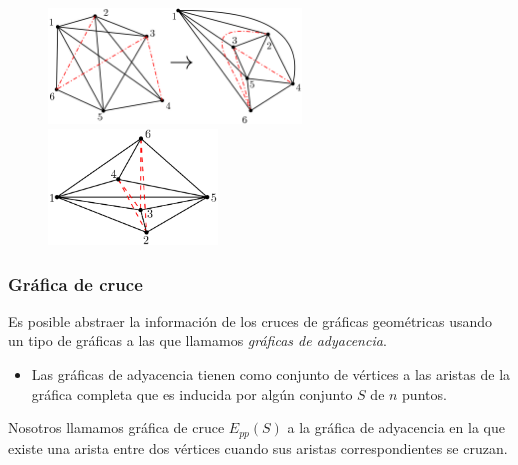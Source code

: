 \begin{frame}
	\begin{figure}
		\centering
		\includegraphics[width=0.6\textwidth]{images/K6_thicknes2}%
		~\vrule
		\includegraphics[width=0.4\textwidth]{images/K6_gthicknes2}
	\end{figure}
\end{frame}

\begin{frame}\frametitle{Gráfica de cruce}
Es posible abstraer la información de los cruces de gráficas geométricas usando un tipo de gráficas a las que llamamos \emph{gráficas de adyacencia}.

\begin{itemize}
	\item Las gráficas de adyacencia tienen como conjunto de vértices a las aristas de la gráfica completa que es inducida por algún conjunto $S$ de $n$ puntos.
\end{itemize}
Nosotros llamamos gráfica de cruce $E_{pp}(S)$ a la gráfica de adyacencia en la que existe una arista entre dos vértices cuando sus aristas correspondientes se cruzan.
\end{frame}

